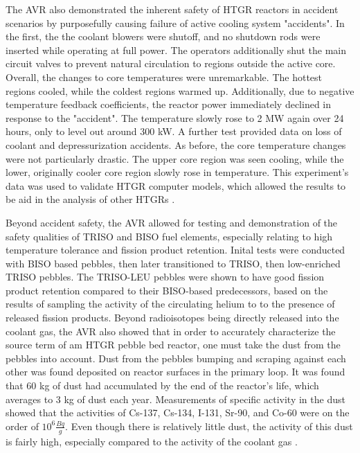 The AVR also demonstrated the inherent safety of HTGR reactors in accident scenarios by purposefully causing failure of active cooling system "accidents".  In the first, the the coolant blowers were shutoff, and no shutdown rods were inserted while operating at full power.  The operators additionally shut the main circuit valves to prevent natural circulation to regions outside the active core.  Overall, the changes to core temperatures were unremarkable.  The hottest regions cooled, while the coldest regions warmed up.  Additionally, due to negative temperature feedback coefficients, the reactor power immediately declined in response to the "accident".  The temperature slowly rose to 2 MW again over 24 hours, only to level out around 300 kW.  A further test provided data on loss of coolant and depressurization accidents.  As before, the core temperature changes were not particularly drastic.  The upper core region was seen cooling, while the lower, originally cooler core region slowly rose in temperature.  This experiment's data was used to validate HTGR computer models, which allowed the results to be aid in the analysis of other HTGRs \cite{noauthor_results_1990}.

Beyond accident safety, the AVR allowed for testing and demonstration of the safety qualities of TRISO and BISO fuel elements, especially relating to high temperature tolerance and fission product retention.  Inital tests were conducted with BISO based pebbles, then later transitioned to TRISO, then low-enriched TRISO pebbles.  The TRISO-LEU pebbles were shown to have good fission product retention compared to their BISO-based predecessors, based on the results of sampling the activity of the circulating helium to to the presence of released fission products.  Beyond radioisotopes being directly released into the coolant gas, the AVR also showed that in order to accurately characterize the source term of am HTGR pebble bed reactor, one must take the dust from the pebbles into account.  Dust from the pebbles bumping and scraping against each other was found deposited on reactor surfaces in the primary loop.  It was found that 60 kg of dust had accumulated by the end of the reactor's life, which averages to 3 kg of dust each year.  Measurements of specific activity in the dust showed that the activities of Cs-137, Cs-134, I-131, Sr-90, and Co-60 were on the order of $10^6 \frac{Bq}{g}$.  Even though there is relatively little dust, the activity of this dust is fairly high, especially compared to the activity of the coolant gas \cite{noauthor_results_1990}.

